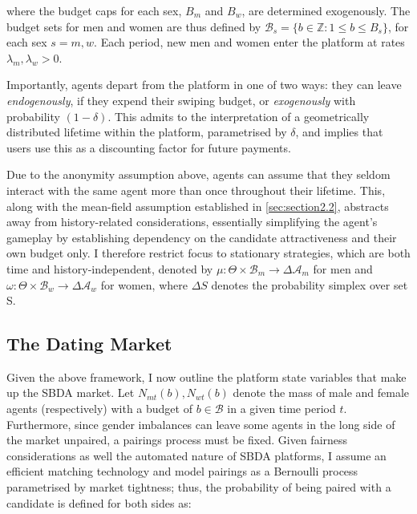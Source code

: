 where the budget caps for each sex, $B_m$ and $B_w$, are determined exogenously. The budget sets for men and women are thus defined by $\mathcal{B}_{s}=\{b \in \mathbb{Z} : 1\leq b \leq B_s\}$, for each sex $s=m,w$. Each period, new men and women enter the platform at rates $\lambda_m, \lambda_w>0$.
\begin{comment}
    , with their attractiveness drawn i.i.d from distributions with cumulative distribution functions $F_m$ and $F_w$, respectively
\end{comment}
Importantly, agents depart from the platform in one of two ways: they can leave \textit{endogenously}, if they expend their swiping budget, or \textit{exogenously} with probability $(1-\delta)$. This admits to the interpretation of a geometrically distributed lifetime within the platform, parametrised by $\delta$, and implies that users use this as a discounting factor for future payments.

Due to the anonymity assumption above, agents can assume that they seldom interact with the same agent more than once throughout their lifetime. This, along with the mean-field assumption established in \autoref{sec:section2.2}, abstracts away from history-related considerations, essentially simplifying the agent's gameplay by establishing dependency on the candidate attractiveness and their own budget only. I therefore restrict focus to stationary strategies, which are both time and history-independent, denoted by $\mu: \Theta \times\mathcal{B}_m\rightarrow \Delta\mathcal{A}_m$ for men and $\omega:\Theta \times\mathcal{B}_w\rightarrow \Delta\mathcal{A}_w$ for women, where $\Delta S$ denotes the probability simplex over set S. 

\subsection{The Dating Market}\label{sec:section2.2}
Given the above framework, I now outline the platform state variables that make up the SBDA market. Let $N_{mt}(b), N_{wt}(b)$ denote the mass of male and female agents (respectively) with a budget of $b\in\mathcal{B}$ in a given time period $t$. Furthermore, since gender imbalances can leave some agents in the long side of the market unpaired, a pairings process must be fixed. Given fairness considerations as well the automated nature of SBDA platforms, I assume an efficient matching technology and model pairings as a Bernoulli process parametrised by market tightness; thus, the probability of being paired with a candidate is defined for both sides as:

